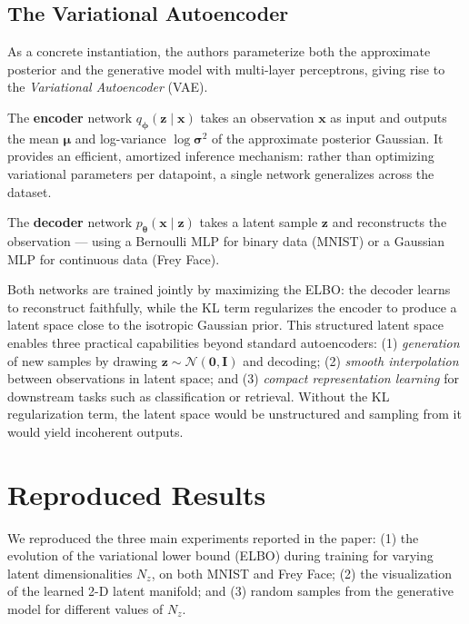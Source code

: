 \documentclass{article}
\begin{document}
\subsection{The Variational Autoencoder}

As a concrete instantiation, the authors parameterize both the approximate posterior
and the generative model with multi-layer perceptrons, giving rise to the
\emph{Variational Autoencoder} (VAE).

The \textbf{encoder} network $q_{\boldsymbol{\phi}}(\mathbf{z} \mid \mathbf{x})$
takes an observation $\mathbf{x}$ as input and outputs the mean
$\boldsymbol{\mu}$ and log-variance $\log \boldsymbol{\sigma}^2$ of the
approximate posterior Gaussian. It provides an efficient, amortized inference
mechanism: rather than optimizing variational parameters per datapoint, a single
network generalizes across the dataset.

The \textbf{decoder} network $p_{\boldsymbol{\theta}}(\mathbf{x} \mid \mathbf{z})$
takes a latent sample $\mathbf{z}$ and reconstructs the observation --- using a
Bernoulli MLP for binary data (MNIST) or a Gaussian MLP for continuous data
(Frey Face).

Both networks are trained jointly by maximizing the ELBO: the decoder learns to
reconstruct faithfully, while the KL term regularizes the encoder to produce a
latent space close to the isotropic Gaussian prior.
This structured latent space enables three practical capabilities beyond standard
autoencoders: (1) \emph{generation} of new samples by drawing $\mathbf{z} \sim \mathcal{N}(\mathbf{0}, \mathbf{I})$
and decoding; (2) \emph{smooth interpolation} between observations in latent space;
and (3) \emph{compact representation learning} for downstream tasks such as
classification or retrieval. Without the KL regularization term, the latent space
would be unstructured and sampling from it would yield incoherent outputs.

\section{Reproduced Results}

We reproduced the three main experiments reported in the paper: (1) the evolution of
the variational lower bound (ELBO) during training for varying latent dimensionalities
$N_z$, on both MNIST and Frey Face; (2) the visualization of the learned 2-D latent
manifold; and (3) random samples from the generative model for different values of $N_z$.
\end{document}
